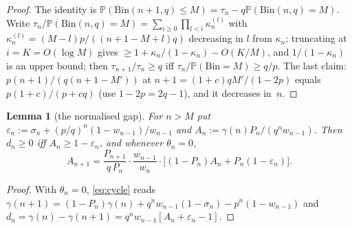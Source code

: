 \documentclass[11pt]{article}
\newtheorem{lemma}[theorem]{Lemma}
\theoremstyle{definition}
\newcommand{\Bin}{\mathrm{Bin}}
\newcommand{\Prob}{\mathbb{P}}
\begin{document}
\begin{proof}
  The identity is $\Prob(\Bin(n+1,q)\le M)=\tau_n-q\Prob(\Bin(n,q)=M)$.
  Write $\tau_n/\Prob(\Bin(n,q)=M)=\sum_{i\ge0}\prod_{l<i}\kappa^{(l)}_n$
  with $\kappa^{(l)}_n=(M-l)p/((n+1-M+l)q)$ decreasing in $l$ from
  $\kappa_n$; truncating at $i=K=O(\log M)$ gives
  $\ge1+\kappa_n/(1-\kappa_n)-O(K/M)$, and $1/(1-\kappa_n)$ is an upper
  bound; then $\tau_{n+1}/\tau_n\ge q$ iff $\tau_n/\Prob(\Bin=M)\ge q/p$.
  The last claim: $p(n+1)/(q(n+1-M'))$ at $n+1=(1+c)qM'/(1-2p)$ equals
  $p(1+c)/(p+cq)$ (use $1-2p=2q-1$), and it decreases in~$n$.
\end{proof}

\begin{lemma}[the normalised gap]\label{lem:A}
  For $n>M$ put $\varepsilon_n:=\sigma_n+(p/q)^n(1-w_{n-1})/w_{n-1}$ and
  $A_n:=\gamma(n)P_n/(q^nw_{n-1})$.  Then $d_n\ge0$ iff
  $A_n\ge1-\varepsilon_n$, and whenever $\theta_n=0$,
  \begin{equation}\label{eq:Arec}
    A_{n+1}=\frac{P_{n+1}}{q\,P_n}\cdot\frac{w_{n-1}}{w_n}\cdot
    \bigl[(1-P_n)A_n+P_n(1-\varepsilon_n)\bigr].
  \end{equation}
\end{lemma}

\begin{proof}
  With $\theta_n=0$, \eqref{eq:cycle} reads
  $\gamma(n+1)=(1-P_n)\gamma(n)+q^nw_{n-1}(1-\sigma_n)-p^n(1-w_{n-1})$ and
  $d_n=\gamma(n)-\gamma(n+1)=q^nw_{n-1}[A_n+\varepsilon_n-1]$.
\end{proof}
\end{document}
